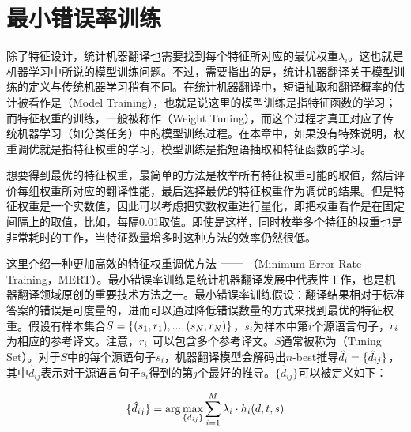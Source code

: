 
\sectionnewpage
\section{最小错误率训练}\label{section-7.6}

\parinterval 除了特征设计，统计机器翻译也需要找到每个特征所对应的最优权重$\lambda_i$。这也就是机器学习中所说的模型训练问题。不过，需要指出的是，统计机器翻译关于模型训练的定义与传统机器学习稍有不同。在统计机器翻译中，短语抽取和翻译概率的估计被看作是{\small{}}（Model Training），也就是说这里的模型训练是指特征函数的学习；而特征权重的训练，一般被称作{\small{}}（Weight Tuning），而这个过程才真正对应了传统机器学习（如分类任务）中的模型训练过程。在本章中，如果没有特殊说明，权重调优就是指特征权重的学习，模型训练是指短语抽取和特征函数的学习。

\parinterval 想要得到最优的特征权重，最简单的方法是枚举所有特征权重可能的取值，然后评价每组权重所对应的翻译性能，最后选择最优的特征权重作为调优的结果。但是特征权重是一个实数值，因此可以考虑把实数权重进行量化，即把权重看作是在固定间隔上的取值，比如，每隔0.01取值。即使是这样，同时枚举多个特征的权重也是非常耗时的工作，当特征数量增多时这种方法的效率仍然很低。

\parinterval 这里介绍一种更加高效的特征权重调优方法$\ \dash \ ${\small{}}（Minimum Error Rate Training，MERT）。最小错误率训练是统计机器翻译发展中代表性工作，也是机器翻译领域原创的重要技术方法之一。最小错误率训练假设：翻译结果相对于标准答案的错误是可度量的，进而可以通过降低错误数量的方式来找到最优的特征权重。假设有样本集合$S = \{(s_1,{r}_1),...,(s_N,{r}_N)\}$，$s_i$为样本中第$i$个源语言句子，${r}_i$为相应的参考译文。注意，${r}_i$ 可以包含多个参考译文。$S$通常被称为{\small{}}（Tuning Set）。对于$S$中的每个源语句子$s_i$，机器翻译模型会解码出$n$-best推导$\hat{{d}}_{i} = \{\hat{d}_{ij}\}$，其中$\hat{d}_{ij}$表示对于源语言句子$s_i$得到的第$j$个最好的推导。$\{\hat{d}_{ij}\}$可以被定义如下：

\begin{eqnarray}
\{\hat{d}_{ij}\} = \arg\max_{\{d_{ij}\}} \sum_{i=1}^{M} \lambda_i \cdot h_i (d,{t},{s})
\label{eq:7-17}
\end{eqnarray}

